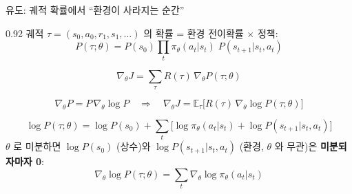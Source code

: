 \begin{frame}{유도: 궤적 확률에서 ``환경이 사라지는 순간''}
\begin{center}\begin{varwidth}{0.92\textwidth}
  \small
  궤적 $\tau=(s_0,a_0,r_1,s_1,\dots)$ 의 확률 = 환경 전이확률 $\times$
  정책:
  \[
  P(\tau;\theta) = P(s_0)\prod_t \pi_\theta(a_t|s_t)\; P(s_{t+1}|s_t, a_t)
  \]
  
  \[
  \nabla_\theta J
  = \sum_\tau R(\tau)\, \nabla_\theta P(\tau;\theta)
  \]
  
  \[
  \nabla_\theta P = P\, \nabla_\theta \log P
  \quad\Rightarrow\quad
  \nabla_\theta J = \mathbb{E}_\tau\big[ R(\tau)\,
  \nabla_\theta \log P(\tau;\theta) \big]
  \]
  
  \[
  \log P(\tau;\theta) = \log P(s_0) + \sum_t
  \big[ \log\pi_\theta(a_t|s_t) + \log P(s_{t+1}|s_t, a_t) \big]
  \]
  $\theta$ 로 미분하면 $\log P(s_0)$ (상수)와
  $\log P(s_{t+1}|s_t,a_t)$ (환경, $\theta$ 와 무관)은
  \textbf{미분되자마자 0}:
  \[
  \nabla_\theta \log P(\tau;\theta) = \sum_t \nabla_\theta
  \log\pi_\theta(a_t|s_t)
  \]
\end{varwidth}\end{center}
\end{frame}

